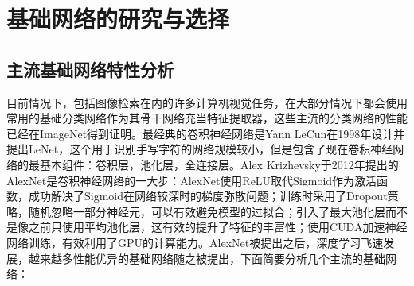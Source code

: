 \chapter{基础网络的研究与选择}

\section{主流基础网络特性分析}
目前情况下，包括图像检索在内的许多计算机视觉任务，在大部分情况下都会使用常用的基础分类网络作为其骨干网络充当特征提取器，这些主流的分类网络的性能已经在ImageNet得到证明。最经典的卷积神经网络是Yann LeCun在1998年设计并提出LeNet，这个用于识别手写字符的网络规模较小，但是包含了现在卷积神经网络的最基本组件：卷积层，池化层，全连接层。Alex Krizhevsky于2012年提出的AlexNet是卷积神经网络的一大步：AlexNet使用ReLU取代Sigmoid作为激活函数，成功解决了Sigmoid在网络较深时的梯度弥散问题；训练时采用了Dropout策略，随机忽略一部分神经元，可以有效避免模型的过拟合；引入了最大池化层而不是像之前只使用平均池化层，这有效的提升了特征的丰富性；使用CUDA加速神经网络训练，有效利用了GPU的计算能力。AlexNet被提出之后，深度学习飞速发展，越来越多性能优异的基础网络随之被提出，下面简要分析几个主流的基础网络：
